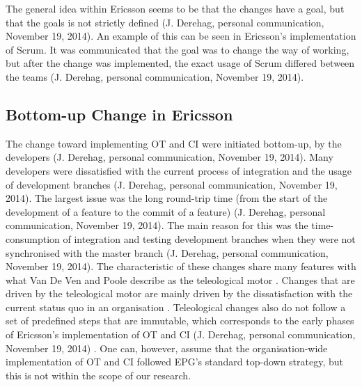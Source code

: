 \documentclass[final_report_innit.tex]{subfiles}
\begin{document}
The general idea within Ericsson seems to be that the changes have a goal, but that the goals is not strictly defined (J. Derehag, personal communication, November 19, 2014). An example of this can be seen in Ericsson’s implementation of Scrum. It was communicated that the goal was to change the way of working, but after the change was implemented, the exact usage of Scrum differed between the teams (J. Derehag, personal communication, November 19, 2014). 

\subsection{Bottom-up Change in Ericsson}
The change toward implementing OT and CI were initiated bottom-up, by the developers (J. Derehag, personal communication, November 19, 2014). Many developers were dissatisfied with the current process of integration and the usage of development branches (J. Derehag, personal communication, November 19, 2014). The largest issue was the long round-trip time (from the start of the development of a feature to the commit of a feature) (J. Derehag, personal communication, November 19, 2014). The main reason for this was the time-consumption of integration and testing development branches when they were not synchronised with the master branch (J. Derehag, personal communication, November 19, 2014). The characteristic of these changes share many features with what Van De Ven and Poole describe as the teleological motor \cite{van1995explaining}. Changes that are driven by the teleological motor are mainly driven by the dissatisfaction with the current status quo in an organisation \cite{van1995explaining}. Teleological changes also do not follow a set of predefined steps that are immutable, which corresponds to the early phases of Ericsson’s implementation of OT and CI (J. Derehag, personal communication, November 19, 2014) \cite{van1995explaining}. One can, however, assume that the organisation-wide implementation of OT and CI followed EPG’s standard top-down strategy, but this is not within the scope of our research.
\end{document}
